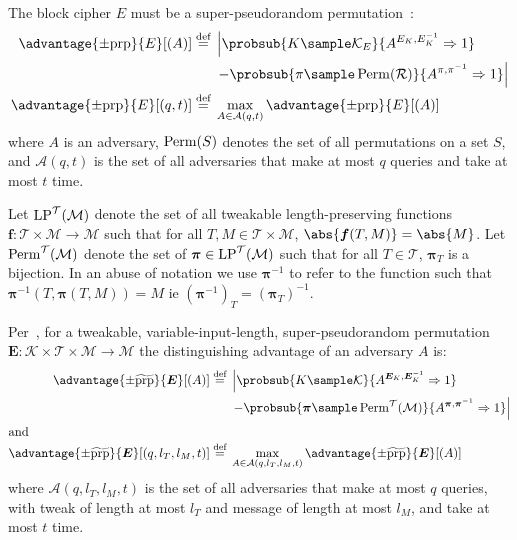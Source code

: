 \documentclass[eprint.tex]{subfiles}
\begin{document}
The block cipher
$E$
must be a super-pseudorandom permutation~\cite{concsym}:
%
\begin{align*}
    \advantage{\pm \mathrm{prp}}{E}[(A)] \defeq
    {}&\left\lvert\probsub{K \sample \mathcal{K}_E}{A^{E_K,E_K^{-1}}\Rightarrow 1}\right.
    \\
    {}&\left. - \probsub{\pi \sample \Perm(\mathcal{R})}{A^{\pi,\pi^{-1}}\Rightarrow 1}\right\rvert
    \\
    \advantage{\pm \mathrm{prp}}{E}[(q, t)] \defeq
    {}&\max_{A \in \mathcal{A}(q, t)} \advantage{\pm \mathrm{prp}}{E}[(A)]
\end{align*}
%
where $A$ is an adversary,
$\operatorname{Perm}(S)$ denotes the set of all permutations on a set $S$,
and
$\mathcal{A}(q, t)$
is the set of all adversaries that make at most $q$ queries and take at most $t$ time.

Let $\operatorname{LP}^\mathcal{T}(\mathcal{M})$ denote the set of all
tweakable length-preserving functions
$\bm{f} : \mathcal{T} \times \mathcal{M} \rightarrow \mathcal{M}$
such that for all $T, M \in \mathcal{T} \times \mathcal{M}$,
$\abs{\bm{f}(T, M)} = \abs{M}$. Let $\operatorname{Perm}^\mathcal{T}(\mathcal{M})$ denote
the set of $\bm{\pi} \in \operatorname{LP}^\mathcal{T}(\mathcal{M})$ such that
for all $T \in \mathcal{T}$, $\bm{\pi}_{T}$ is a bijection.
In an abuse of notation
we use $\bm{\pi}^{-1}$ to refer to the function
such that $\bm{\pi}^{-1}(T, \bm{\pi}(T, M)) = M$ ie $(\bm{\pi}^{-1})_T = (\bm{\pi}_T)^{-1}$.

Per~\cite{cmc}, for a tweakable, variable-input-length, super-pseudorandom permutation
$\bm{E} : \mathcal{K} \times \mathcal{T} \times \mathcal{M} \rightarrow \mathcal{M}$
the distinguishing advantage of an adversary $A$ is:
%
\begin{align*}
    \advantage{\pm \widetilde{\mathrm{prp}}}{\bm{E}}[(A)] \defeq
    {}&\left\lvert\probsub{K \sample \mathcal{K}}{A^{\bm{E}_K,\bm{E}_K^{-1}}\Rightarrow 1}\right.
    \\
    {}&\left. - \probsub{\bm{\pi} \sample \Perm^\mathcal{T}(\mathcal{M})}
        {A^{\bm{\pi},\bm{\pi}^{-1}}\Rightarrow 1}\right\rvert
    \\
    \intertext{and}
    \advantage{\pm \widetilde{\mathrm{prp}}}{\bm{E}}[(q, l_T, l_M, t)]
    \defeq {}&
    \max_{A \in \mathcal{A}(q, l_T, l_M, t)} \advantage{\pm \widetilde{\mathrm{prp}}}{\bm{E}}[(A)]
\end{align*}
%
\begin{displaymath}
\end{displaymath}
where $\mathcal{A}(q, l_T, l_M, t)$
is the set of all adversaries that
make at most $q$ queries,
with tweak of length at most $l_T$
and message of length at most $l_M$,
and take at most $t$ time.
\end{document}
